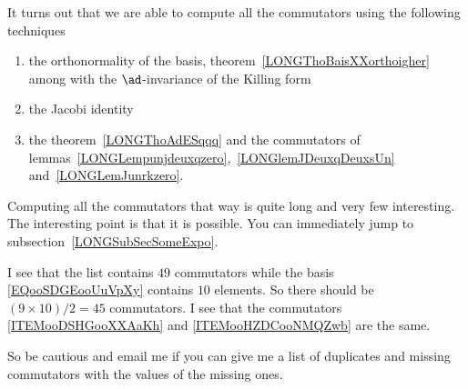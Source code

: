 It turns out that we are able to compute all the commutators using the following techniques
\begin{enumerate}

	\item
	      the orthonormality of the basis, theorem~\ref{LONGThoBaisXXorthoigher} among with the $\ad$-invariance of the Killing form
	\item
	      the Jacobi identity
	\item
	      the theorem~\ref{LONGThoAdESqqq} and the commutators of lemmas~\ref{LONGLempunjdeuxqzero},~\ref{LONGlemJDeuxqDeuxsUn} and~\ref{LONGLemJunrkzero}.

\end{enumerate}
Computing all the commutators that way is quite long and very few interesting. The interesting point is that it is possible. You can immediately jump to subsection~\ref{LONGSubSecSomeExpo}.

\begin{probleme}
	I see that the list contains \( 49\) commutators while the basis \eqref{EQooSDGEooUuVpXy} contains \( 10\) elements. So there should be \( (9\times 10)/2=45\) commutators. I see that the commutators \ref{ITEMooDSHGooXXAaKh} and \ref{ITEMooHZDCooNMQZwb} are the same.

	So be cautious and email me if you can give me a list of duplicates and missing commutators with the values of the missing ones.
\end{probleme}

